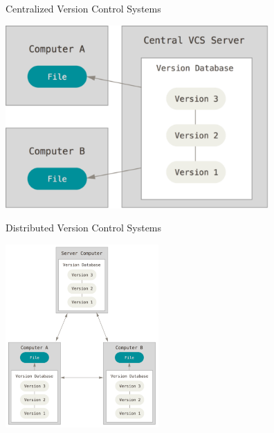 \begin{frame}[t]{Centralized Version Control Systems}
  \begin{center}
    \includegraphics[height=2.75in]{./images/02-getting-started/centralized}
  \end{center}
\end{frame}

\begin{frame}[t]{Distributed Version Control Systems}
  \begin{center}
    \includegraphics[height=2.75in]{./images/02-getting-started/distributed}
  \end{center}
\end{frame}

